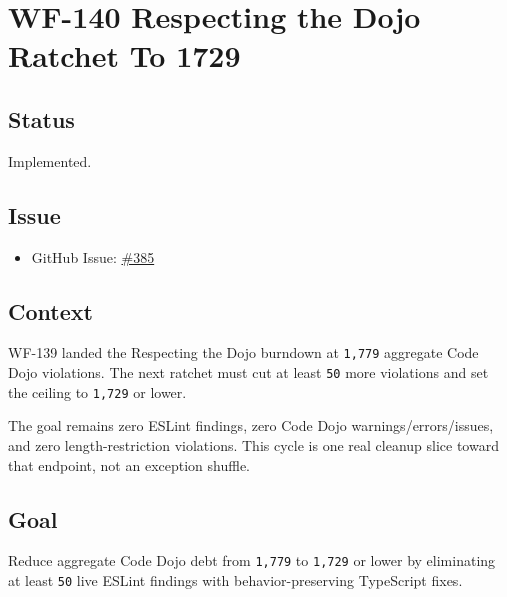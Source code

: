 \chapter{WF-140 Respecting the Dojo Ratchet To 1729}\label{record-222}

\smallskip

\section{Status}\label{record-222-status}

Implemented.

\section{Issue}\label{record-222-issue}

\begin{itemize}
\tightlist
\item
  GitHub Issue: \href{https://github.com/flyingrobots/bijou/issues/385}{\#385}
\end{itemize}

\section{Context}\label{record-222-context}

WF-139 landed the Respecting the Dojo burndown at \texttt{1\allowbreak{},\allowbreak{}7\allowbreak{}7\allowbreak{}9} aggregate Code Dojo violations. The next ratchet must cut at least \texttt{5\allowbreak{}0} more violations and set the ceiling to \texttt{1\allowbreak{},\allowbreak{}7\allowbreak{}2\allowbreak{}9} or lower.

The goal remains zero ESLint findings, zero Code Dojo warnings/errors/issues, and zero length-restriction violations. This cycle is one real cleanup slice toward that endpoint, not an exception shuffle.

\section{Goal}\label{record-222-goal}

Reduce aggregate Code Dojo debt from \texttt{1\allowbreak{},\allowbreak{}7\allowbreak{}7\allowbreak{}9} to \texttt{1\allowbreak{},\allowbreak{}7\allowbreak{}2\allowbreak{}9} or lower by eliminating at least \texttt{5\allowbreak{}0} live ESLint findings with behavior-preserving TypeScript fixes.

